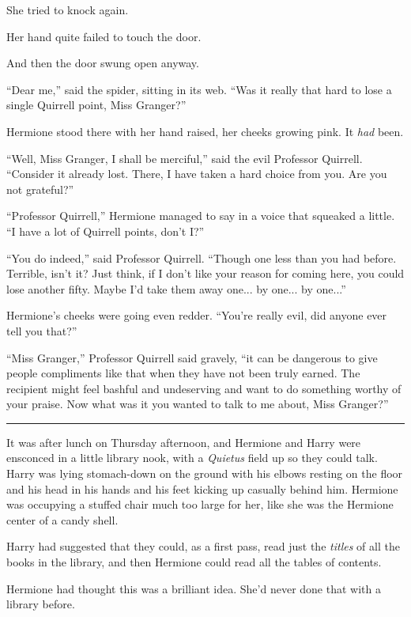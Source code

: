 She tried to knock again.

Her hand quite failed to touch the door.

And then the door swung open anyway.

``Dear me,'' said the spider, sitting in its web. ``Was it really that
hard to lose a single Quirrell point, Miss Granger?''

Hermione stood there with her hand raised, her cheeks growing pink. It
\emph{had} been.

``Well, Miss Granger, I shall be merciful,'' said the evil Professor
Quirrell. ``Consider it already lost. There, I have taken a hard choice
from you. Are you not grateful?''

``Professor Quirrell,'' Hermione managed to say in a voice that squeaked
a little. ``I have a lot of Quirrell points, don't I?''

``You do indeed,'' said Professor Quirrell. ``Though one less than you
had before. Terrible, isn't it? Just think, if I don't like your reason
for coming here, you could lose another fifty. Maybe I'd take them away
one... by one... by one...''

Hermione's cheeks were going even redder. ``You're really evil, did
anyone ever tell you that?''

``Miss Granger,'' Professor Quirrell said gravely, ``it can be dangerous
to give people compliments like that when they have not been truly
earned. The recipient might feel bashful and undeserving and want to do
something worthy of your praise. Now what was it you wanted to talk to
me about, Miss Granger?''

\begin{center}\rule{3in}{0.4pt}\end{center}

It was after lunch on Thursday afternoon, and Hermione and Harry were
ensconced in a little library nook, with a \emph{Quietus} field up so
they could talk. Harry was lying stomach-down on the ground with his
elbows resting on the floor and his head in his hands and his feet
kicking up casually behind him. Hermione was occupying a stuffed chair
much too large for her, like she was the Hermione center of a candy
shell.

Harry had suggested that they could, as a first pass, read just the
\emph{titles} of all the books in the library, and then Hermione could
read all the tables of contents.

Hermione had thought this was a brilliant idea. She'd never done that
with a library before.

